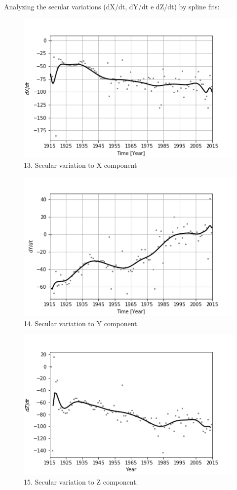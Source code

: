 \documentclass[final,t]{beamer}
\begin{document}
\begin{columns}[t]
\begin{column}{.25\linewidth}
\begin{block}{}
	
	Analyzing the secular variations (dX/dt, dY/dt e dZ/dt) by spline fits: 		
	\begin{figure}
		\centering
		\includegraphics[width=0.8\linewidth]{spline101sv_X_spline}
		\caption{13. Secular variation to X component}
		\label{SPLINEx}
	\end{figure}
	
	\begin{figure}
		\centering
		\includegraphics[width=0.8\linewidth]{spline100sv_y_spline}
		\caption{14. Secular variation to Y component.}
		\label{SPLINEy}
	\end{figure}
	
	\begin{figure}
		\centering
		\includegraphics[width=0.8\linewidth]{spline100sv_z_spline}
		\caption{15. Secular variation to Z component.}
		\label{Splinez}
	\end{figure}


\end{block}
\end{column}
\end{columns}
\end{document}
